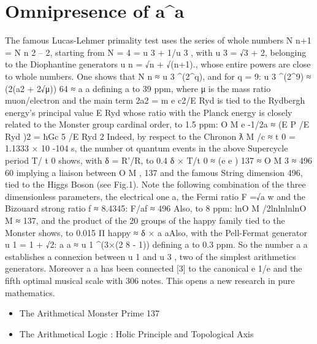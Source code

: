 \section {Omnipresence of a^a}

The famous Lucas-Lehmer primality test uses the series of whole numbers N n+1 = N n 2 – 2,
starting from N = 4 = u 3 + 1/u 3 , with u 3 = √3 + 2, belonging to the Diophantine generators u n = √n +
√(n+1)., whose entire powers are close to whole numbers. One shows that N n ≈ u 3 ^(2^q), and for q
= 9:
u 3 ^(2^9) ≈ (2(a2 + 2√μ)) 64 ≈ a a
defining a to 39 ppm, where μ is the mass ratio muon/electron and the main term 2a2 = m e c2/E Ryd is
tied to the Rydbergh energy's principal value E Ryd whose ratio with the Planck energy is closely
related to the Monster group cardinal order, to 1.5 ppm:
O M e -1/2a ≈ (E P /E Ryd )2 = ħGc 5 /E Ryd 2
Indeed, by respect to the Chronon ƛ M /c ≈ t 0 = 1.1333 × 10 -104 s, the number ot quantum events in
the above Supercycle period T/ t 0 shows, with δ = R'/R, to 0.4%
δ × T/t 0 ≈ (e e ) 137 ≈ O M 3 ≈ 496 60
implying a liaison between O M , 137 and the famous String dimension 496, tied to the Higgs Boson
(see Fig.1). Note the following combination of the three dimensionless parameters, the electrical
one a, the Fermi ratio F =√a w and the Bizouard strong ratio f ≈ 8.4345:
F/af ≈ 496
Also, to 8 ppm: lnO M /2lnlnlnlnO M ≈ 137, and the product of the 20 groups of the happy family tied
to the Monster shows, to 0.015 %
Π happy ≈ δ × a aAlso, with the Pell-Fermat generator u 1 = 1 + √2:
a a ≈ u 1 ^(3×(2 8 - 1))
defining a to 0.3 ppm. So the number a a establishes a connexion between u 1 and u 3 , two of the
simplest arithmetics generators. Moreover a a has been connected [3] to the canonical e 1/e and the
fifth optimal musical scale with 306 notes. This opens a new research in pure mathematics.


\begin{itemize}
\item The Arithmetical Monster Prime 137
\item The Arithmetical Logic : Holic Principle and Topological Axis
\end{itemize}

